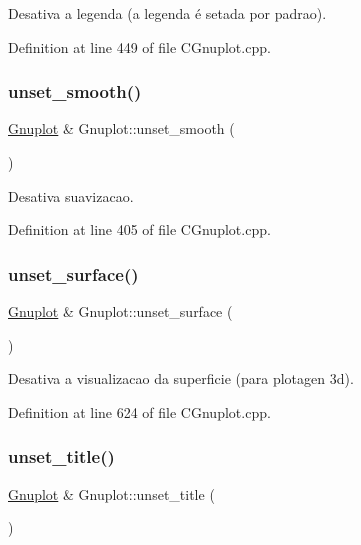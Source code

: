 Desativa a legenda (a legenda é setada por padrao). 



Definition at line 449 of file C\+Gnuplot.\+cpp.

\mbox{\label{class_gnuplot_aec18795f217d6d8791275a1c866b550e}} 
\subsubsection{\texorpdfstring{unset\+\_\+smooth()}{unset\_smooth()}}
{\footnotesize\ttfamily \hyperlink{class_gnuplot}{Gnuplot} \& Gnuplot\+::unset\+\_\+smooth (\begin{DoxyParamCaption}{ }\end{DoxyParamCaption})}



Desativa suavizacao. 



Definition at line 405 of file C\+Gnuplot.\+cpp.

\mbox{\label{class_gnuplot_a805f1807c9b3a0a6745d66fa1729e3be}} 
\subsubsection{\texorpdfstring{unset\+\_\+surface()}{unset\_surface()}}
{\footnotesize\ttfamily \hyperlink{class_gnuplot}{Gnuplot} \& Gnuplot\+::unset\+\_\+surface (\begin{DoxyParamCaption}{ }\end{DoxyParamCaption})}



Desativa a visualizacao da superficie (para plotagen 3d). 



Definition at line 624 of file C\+Gnuplot.\+cpp.

\mbox{\label{class_gnuplot_a0d205a55ae104403292622b49af14ae7}} 
\subsubsection{\texorpdfstring{unset\+\_\+title()}{unset\_title()}}
{\footnotesize\ttfamily \hyperlink{class_gnuplot}{Gnuplot} \& Gnuplot\+::unset\+\_\+title (\begin{DoxyParamCaption}{ }\end{DoxyParamCaption})}



